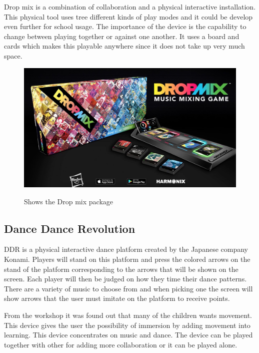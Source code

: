 Drop mix is a combination of collaboration and a physical interactive installation. This physical tool uses tree different kinds of play modes and it could be develop even further for school usage. The importance of the device is the capability to change between playing together or against one another. It uses a board and cards which makes this playable anywhere since it does not take up very much space. \cite{Dropmix}

\begin{figure}[H]
	\centering
	\includegraphics[width=0.7\linewidth]{figure/Analysis/dropmix}
	\label{fig:dropmix}
	\caption{Shows the Drop mix package \cite{Dropmix}}
\end{figure}


\subsection{Dance Dance Revolution}
DDR is a physical interactive dance platform created by the Japanese company Konami. Players will stand on this platform and press the colored arrows on the stand of the platform corresponding to the arrows that will be shown on the screen. Each player will then be judged on how they time their dance patterns. There are a variety of music to choose from and when picking one the screen will show arrows that the user must imitate on the platform to receive points. 

From the workshop it was found out that many of the children wants movement. This device gives the user the possibility of immersion by adding movement into learning. This device concentrates on music and dance. The device can be played together with other for adding more collaboration or it can be played alone. \cite{DanceDanceRevolution}

